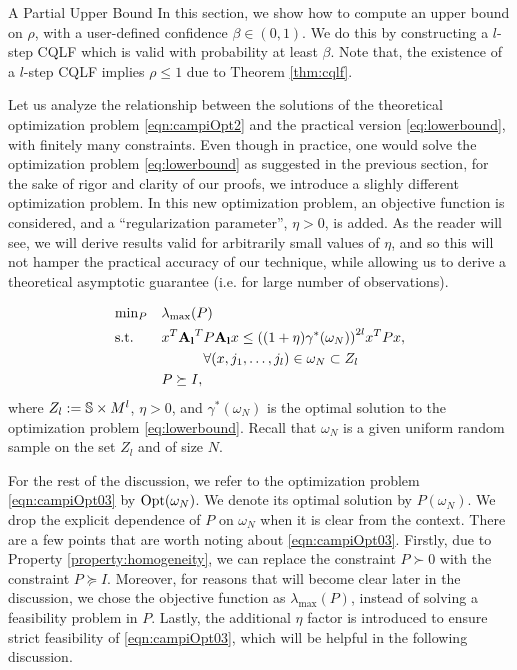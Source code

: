 \begin{subsection}{A Partial Upper Bound}\label{sec:IntroMainThm}
In this section, we show how to compute an upper bound on $\rho$, with a user-defined confidence $\beta \in (0, 1)$. We do this by constructing a $l$-step CQLF which is valid with probability at least $\beta$. Note that, the existence of a $l$-step CQLF implies $\rho \leq 1$ due to Theorem \ref{thm:cqlf}.

Let us analyze the relationship between the solutions of the theoretical optimization problem \eqref{eqn:campiOpt2} and the practical version \eqref{eq:lowerbound}, with finitely many constraints. Even though in practice, one would solve the optimization problem  \eqref{eq:lowerbound} as suggested in the previous section, for the sake of rigor and clarity of our proofs, we introduce a slighly different optimization problem. In this new optimization problem, an objective function is considered, and a ``regularization parameter'', $\eta > 0$, is added. As the reader will see, we will derive results valid for arbitrarily small values of $\eta$, and so this will not hamper the practical accuracy of our technique, while allowing us to derive a theoretical asymptotic guarantee (i.e. for large number of observations).

\begin{equation}\label{eqn:campiOpt03}
\begin{aligned}
& \text{min}_{P} & & \lambda_{\max}(P) \\
& \text{s.t.} 
&  & x^T\mathbf{A_l}^T P \mathbf{A_l} x \leq {((1 +\eta)\gamma^*(\omega_N))}^{2l} x^T P x,\\
&&&\qquad \quad \forall (x, j_{1},\dots, j_{l}) \in \omega_N \subset Z_l \\
& && P \succeq I, \\
\end{aligned}
\end{equation}
where $Z_l:= \mathbb{S} \times M^l$, $\eta > 0$, and $\gamma^*(\omega_N)$ is the optimal solution to the optimization problem \eqref{eq:lowerbound}. Recall that $\omega_N$ is a given uniform random sample on the set $Z_l$ and of size $N$. 

For the rest of the discussion, we refer to the optimization problem \eqref{eqn:campiOpt03} by $ \text{Opt}(\omega_N)$. We denote its optimal solution by $P(\omega_N)$. We drop the explicit dependence of $P$ on $\omega_N$ when it is clear from the context. There are a few points that are worth noting about \eqref{eqn:campiOpt03}. Firstly, due to Property \ref{property:homogeneity}, we can replace the constraint $P \succ 0$ with the constraint $P \succeq I$. Moreover, for reasons that will become clear later in the discussion, we chose the objective function as $\lambda_{\max}(P)$, instead of solving a feasibility problem in $P$. Lastly, the additional $\eta$ factor is introduced to ensure strict feasibility of \eqref{eqn:campiOpt03}, which will be helpful in the following discussion.


\end{subsection}

